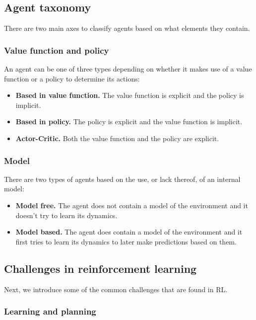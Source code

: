 \subsection{Agent taxonomy}

There are two main axes to classify agents based on what elements they contain.

\subsubsection*{Value function and policy}

An agent can be one of three types depending on whether it makes use of a value function or a policy to determine its actions:

\begin{itemize}
    \item \textbf{Based in value function.} The value function is explicit and the policy is implicit.
    \item \textbf{Based in policy.} The policy is explicit and the value function is implicit.
    \item \textbf{Actor-Critic.} Both the value function and the policy are explicit.
\end{itemize}

\subsubsection*{Model}

There are two types of agents based on the use, or lack thereof, of an internal model:

\begin{itemize}
    \item \textbf{Model free.} The agent does not contain a model of the environment and it doesn't try to learn its dynamics.
    \item \textbf{Model based.} The agent does contain a model of the environment and it first tries to learn its dynamics to later make predictions based on them.
\end{itemize}

\subsection{Challenges in reinforcement learning}
\label{sec:challenges}

Next, we introduce some of the common challenges that are found in RL.

\subsubsection*{Learning and planning}

